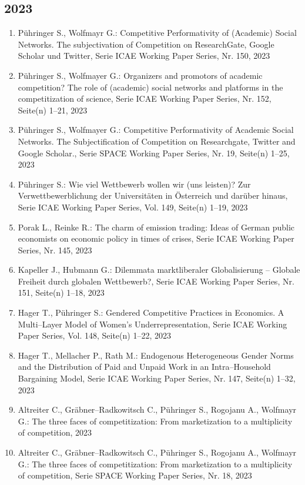 \subsection*{2023}
\begin{enumerate}
    	 \item Pühringer S., Wolfmayr G.: Competitive Performativity of (Academic) Social Networks. The subjectivation of Competition on ResearchGate, Google Scholar und Twitter, Serie ICAE Working Paper Series, Nr. 150, 2023
	 \item Pühringer S., Wolfmayer G.: Organizers and promotors of academic competition? The role of (academic) social networks and platforms in the competitization of science, Serie ICAE Working Paper Series, Nr. 152, Seite(n) 1--21, 2023
	 \item Pühringer S., Wolfmayer G.: Competitive Performativity of Academic Social Networks. The Subjectification of Competition on Researchgate, Twitter and Google Scholar., Serie SPACE Working Paper Series, Nr. 19, Seite(n) 1--25, 2023
	 \item Pühringer S.: Wie viel Wettbewerb wollen wir (uns leisten)? Zur Verwettbewerblichung der Universitäten in Österreich und darüber hinaus, Serie ICAE Working Paper Series, Vol. 149, Seite(n) 1--19, 2023
	 \item Porak L., Reinke R.: The charm of emission trading: Ideas of German public economists on economic policy in times of crises, Serie ICAE Working Paper Series, Nr. 145, 2023
	 \item Kapeller J., Hubmann G.: Dilemmata marktliberaler Globalisierung – Globale Freiheit durch globalen Wettbewerb?, Serie ICAE Working Paper Series, Nr. 151, Seite(n) 1--18, 2023
	 \item Hager T., Pühringer S.: Gendered Competitive Practices in Economics. A Multi--Layer Model of Women’s Underrepresentation, Serie ICAE Working Paper Series, Vol. 148, Seite(n) 1--22, 2023
	 \item Hager T., Mellacher P., Rath M.: Endogenous Heterogeneous Gender Norms and the Distribution of Paid and Unpaid Work in an Intra--Household Bargaining Model, Serie ICAE Working Paper Series, Nr. 147, Seite(n) 1--32, 2023
	 \item Altreiter C., Gräbner--Radkowitsch C., Pühringer S., Rogojanu A., Wolfmayr G.: The three faces of competitization: From marketization to a multiplicity of competition, 2023
	 \item Altreiter C., Gräbner--Radkowitsch C., Pühringer S., Rogojanu A., Wolfmayr G.: The three faces of competitization: From marketization to a multiplicity of competition, Serie SPACE Working Paper Series, Nr. 18, 2023
\end{enumerate}
